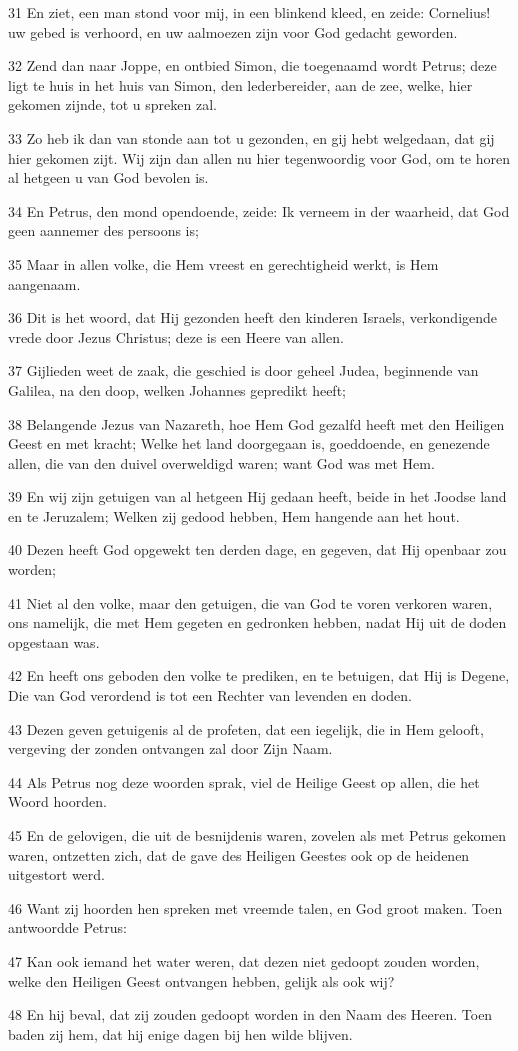 \par 31 En ziet, een man stond voor mij, in een blinkend kleed, en zeide: Cornelius! uw gebed is verhoord, en uw aalmoezen zijn voor God gedacht geworden.
\par 32 Zend dan naar Joppe, en ontbied Simon, die toegenaamd wordt Petrus; deze ligt te huis in het huis van Simon, den lederbereider, aan de zee, welke, hier gekomen zijnde, tot u spreken zal.
\par 33 Zo heb ik dan van stonde aan tot u gezonden, en gij hebt welgedaan, dat gij hier gekomen zijt. Wij zijn dan allen nu hier tegenwoordig voor God, om te horen al hetgeen u van God bevolen is.
\par 34 En Petrus, den mond opendoende, zeide: Ik verneem in der waarheid, dat God geen aannemer des persoons is;
\par 35 Maar in allen volke, die Hem vreest en gerechtigheid werkt, is Hem aangenaam.
\par 36 Dit is het woord, dat Hij gezonden heeft den kinderen Israels, verkondigende vrede door Jezus Christus; deze is een Heere van allen.
\par 37 Gijlieden weet de zaak, die geschied is door geheel Judea, beginnende van Galilea, na den doop, welken Johannes gepredikt heeft;
\par 38 Belangende Jezus van Nazareth, hoe Hem God gezalfd heeft met den Heiligen Geest en met kracht; Welke het land doorgegaan is, goeddoende, en genezende allen, die van den duivel overweldigd waren; want God was met Hem.
\par 39 En wij zijn getuigen van al hetgeen Hij gedaan heeft, beide in het Joodse land en te Jeruzalem; Welken zij gedood hebben, Hem hangende aan het hout.
\par 40 Dezen heeft God opgewekt ten derden dage, en gegeven, dat Hij openbaar zou worden;
\par 41 Niet al den volke, maar den getuigen, die van God te voren verkoren waren, ons namelijk, die met Hem gegeten en gedronken hebben, nadat Hij uit de doden opgestaan was.
\par 42 En heeft ons geboden den volke te prediken, en te betuigen, dat Hij is Degene, Die van God verordend is tot een Rechter van levenden en doden.
\par 43 Dezen geven getuigenis al de profeten, dat een iegelijk, die in Hem gelooft, vergeving der zonden ontvangen zal door Zijn Naam.
\par 44 Als Petrus nog deze woorden sprak, viel de Heilige Geest op allen, die het Woord hoorden.
\par 45 En de gelovigen, die uit de besnijdenis waren, zovelen als met Petrus gekomen waren, ontzetten zich, dat de gave des Heiligen Geestes ook op de heidenen uitgestort werd.
\par 46 Want zij hoorden hen spreken met vreemde talen, en God groot maken. Toen antwoordde Petrus:
\par 47 Kan ook iemand het water weren, dat dezen niet gedoopt zouden worden, welke den Heiligen Geest ontvangen hebben, gelijk als ook wij?
\par 48 En hij beval, dat zij zouden gedoopt worden in den Naam des Heeren. Toen baden zij hem, dat hij enige dagen bij hen wilde blijven.

